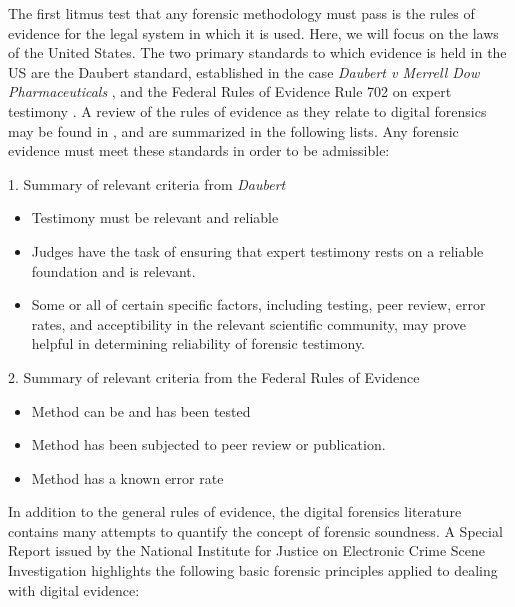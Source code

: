 The first litmus test that any forensic methodology must pass is the rules of evidence for the legal system in which it is used. Here, we will
focus on the laws of the United States. The two primary standards to which evidence is held in the US are the Daubert standard, established
in the case \emph{Daubert v Merrell Dow Pharmaceuticals} \cite{Daubert1993}, and the Federal Rules of Evidence Rule 702 on expert testimony \cite{FedRules702}. 
A review of the rules of evidence as they relate to 
digital forensics may be found in \cite{meyers2005}, and are summarized in the following lists. Any forensic
evidence must meet these standards in order to be admissible:


\begin{center}
1. Summary of relevant criteria from \emph{Daubert}
\end{center}
\begin{itemize}
  \item Testimony must be relevant and reliable
  \item Judges have the task of ensuring that expert testimony rests on a reliable
        foundation and is relevant.
  \item Some or all of certain specific factors, including testing, peer review, error
        rates, and acceptibility in the relevant scientific community, may prove helpful
        in determining reliability of forensic testimony.
\end{itemize}

\newpage

\begin{center}
 2. Summary of relevant criteria from the Federal Rules of Evidence
\begin{itemize}
  \item Method can be and has been tested
  \item Method has been subjected to peer review or publication.
  \item Method has a known error rate
\end{itemize}

\end{center}


In addition to the general rules of evidence, the digital forensics literature contains many attempts to quantify the concept of forensic soundness.
A Special Report issued by the National Institute for Justice on Electronic Crime Scene Investigation \cite{NIJ2008} highlights the following basic forensic 
principles applied to dealing with digital evidence:


